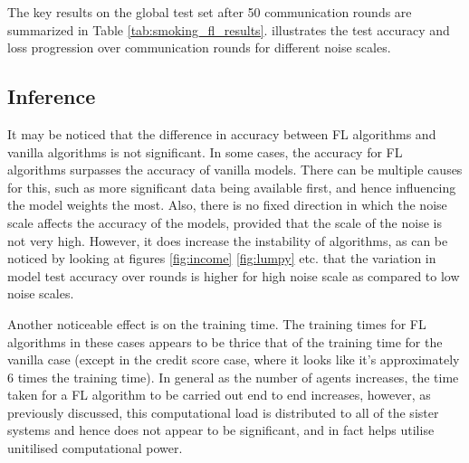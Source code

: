 \documentclass[10pt,twocolumn]{article}
\begin{document}
The key results on the global test set after 50 communication rounds are summarized in Table \ref{tab:smoking_fl_results}. illustrates the test accuracy and loss progression over communication rounds for different noise scales.

\begin{table}[hbtp]
  \centering
  \caption{FL Performance on Smoking Dataset (50 Rounds)}
  \label{tab:smoking_fl_results}
\end{table}

\subsection{Inference}
It may be noticed that the difference in accuracy between FL algorithms and vanilla algorithms is not significant. In some cases, the accuracy for FL algorithms surpasses the accuracy of vanilla models. There can be multiple causes for this, such as more significant data being available first, and hence influencing the model weights the most. Also, there is no fixed direction in which the noise scale affects the accuracy of the models, provided that the scale of the noise is not very high. However, it does increase the instability of algorithms, as can be noticed by looking at figures \ref{fig:income} \ref{fig:lumpy} etc. that the variation in model test accuracy over rounds is higher for high noise scale as compared to low noise scales.  

Another noticeable effect is on the training time. The training times for FL algorithms in these cases appears to be thrice that of the training time for the vanilla case (except in the credit score case, where it looks like it's approximately 6 times the training time). In general as the number of agents increases, the time taken for a FL algorithm to be carried out end to end increases, however, as previously discussed, this computational load is distributed to all of the sister systems and hence does not appear to be significant, and in fact helps utilise unitilised computational power. 
 
\end{document}
